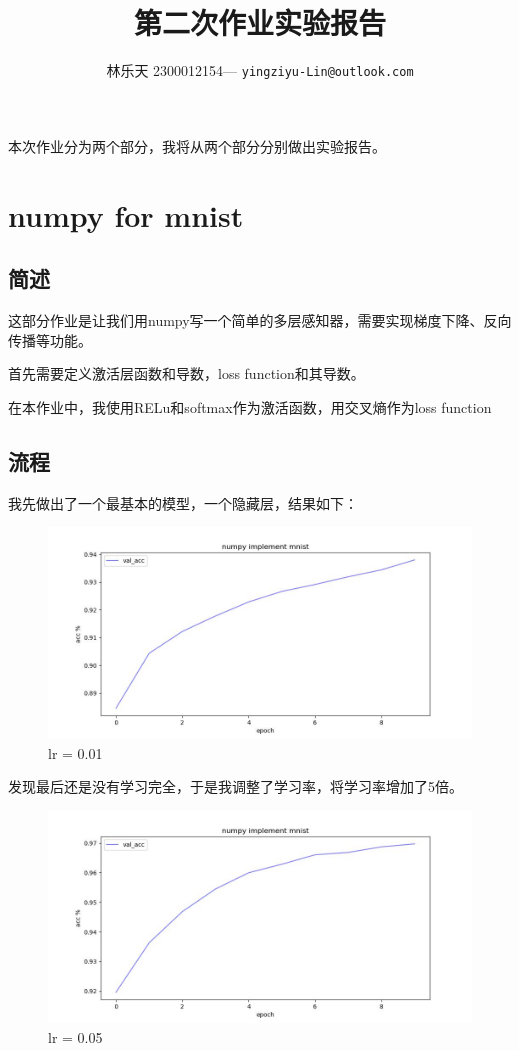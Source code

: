 \documentclass[UTF8]{ctexart}
\title{
	第二次作业实验报告
}
\author{
	林乐天 2300012154--- \texttt{yingziyu-Lin@outlook.com}
}
\begin{document}
\maketitle
本次作业分为两个部分，我将从两个部分分别做出实验报告。

\section{numpy for mnist}
\subsection{简述}
这部分作业是让我们用numpy写一个简单的多层感知器，需要实现梯度下降、反向传播等功能。

首先需要定义激活层函数和导数，loss function和其导数。

在本作业中，我使用RELu和softmax作为激活函数，用交叉熵作为loss function

\subsection{流程}
我先做出了一个最基本的模型，一个隐藏层，结果如下：
\begin{figure}[H]
\centering
\includegraphics[scale=0.5]{numpy_acc.jpg}
\caption{lr = 0.01}
\end{figure}

发现最后还是没有学习完全，于是我调整了学习率，将学习率增加了5倍。
\begin{figure}[H]
\centering
\includegraphics[scale=0.5]{numpy_acc_2.jpg}
\caption{lr = 0.05}
\end{figure}
\end{document}
